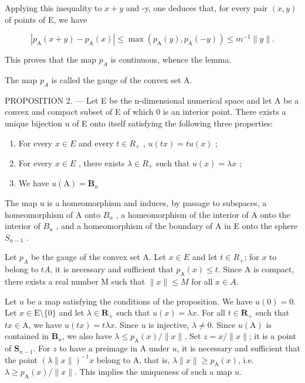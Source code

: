 Applying this inequality to \(x + y\) and -y, one deduces that, for every pair \((x, y)\) of points of E, we have

\[
| p _ {\mathrm{A}} (x + y) - p _ {\mathrm{A}} (x) | \leqslant \max (p _ {\mathrm{A}} (y), p _ {\mathrm{A}} (- y)) \leqslant m ^ {- 1} \| y \|.
\]

This proves that the map \(p_{A}\) is continuous, whence the lemma.

The map \(p_{A}\) is called the gauge of the convex set A.

PROPOSITION 2. --- Let E be the n-dimensional numerical space and let A be a convex and compact subset of E of which 0 is an interior point. There exists a unique bijection u of E onto itself satisfying the following three properties:

\begin{enumerate}
\def\labelenumi{(\roman{enumi})}
\item
  For every \(x \in E\) and every \(t \in R_{+}\) , \(u(tx) = tu(x)\) ;
\item
  For every \(x \in E\) , there exists \(\lambda \in R_{+}\) such that \(u(x) = \lambda x\) ;
\item
  We have \(u(\mathrm{A}) = \mathbf{B}_n\)
\end{enumerate}

The map u is a homeomorphism and induces, by passage to subspaces, a homeomorphism of A onto \(B_{n}\) , a homeomorphism of the interior of A onto the interior of \(B_{n}\) , and a homeomorphism of the boundary of A in E onto the sphere \(S_{n-1}\) .

Let \(p_{A}\) be the gauge of the convex set A. Let \(x \in E\) and let \(t \in R_{+}\); for \(x\) to belong to \(tA\), it is necessary and sufficient that \(p_{\mathrm{A}}(x) \leqslant t\). Since A is compact, there exists a real number M such that \(\|x\| \leqslant M\) for all \(x \in A\).

Let \(u\) be a map satisfying the conditions of the proposition. We have \(u(0) = 0\). Let \(x \in \mathrm{E}\setminus\{0\}\) and let \(\lambda \in \mathbf{R}_+\) such that \(u(x) = \lambda x\). For all \(t \in \mathbf{R}_+\) such that \(tx \in \mathrm{A}\), we have \(u(tx) = t\lambda x\). Since \(u\) is injective, \(\lambda \neq 0\). Since \(u(\mathrm{A})\) is contained in \(\mathbf{B}_n\), we also have \(\lambda \leqslant p_{\mathrm{A}}(x)/\|x\|\). Set \(z = x/\|x\|\); it is a point of \(\mathbf{S}_{n-1}\). For \(z\) to have a preimage in A under \(u\), it is necessary and sufficient that the point \((\lambda \|x\|)^{-1}x\) belong to A, that is, \(\lambda \|x\| \geqslant p_{\mathrm{A}}(x)\), i.e. \(\lambda \geqslant p_{\mathrm{A}}(x)/\|x\|\). This implies the uniqueness of such a map \(u\).

